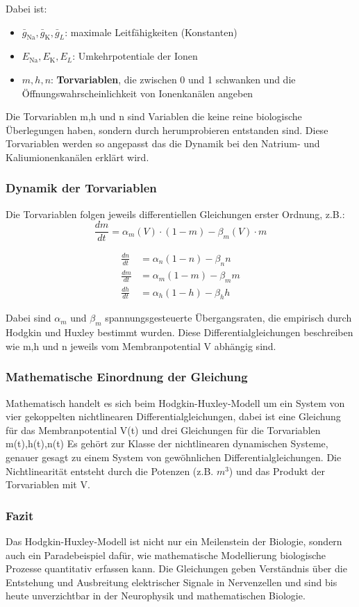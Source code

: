 \begin{refsection}
Dabei ist:

\begin{itemize}
	\item $\bar{g}_{\text{Na}}, \bar{g}_{\text{K}}, \bar{g}_L$: maximale Leitfähigkeiten (Konstanten)
	\item $E_{\text{Na}}, E_{\text{K}}, E_L$: Umkehrpotentiale der Ionen
	\item $m, h, n$: \textbf{Torvariablen}, die zwischen 0 und 1 schwanken und die Öffnungswahrscheinlichkeit von Ionenkanälen angeben
\end{itemize}
Die Torvariablen m,h und n sind Variablen die keine reine biologische Überlegungen haben, sondern durch herumprobieren entstanden sind. Diese Torvariablen werden so angepasst das die Dynamik bei den Natrium- und Kaliumionenkanälen erklärt wird.
\subsubsection{Dynamik der Torvariablen}
Die Torvariablen folgen jeweils differentiellen Gleichungen erster Ordnung, z.B.:
\[\frac{dm}{dt} = \alpha_m(V) \cdot (1 - m) - \beta_m(V) \cdot m\]

\begin{align}
	\frac{dn}{dt} &= \alpha_n (1 - n) - \beta_n n \\
	\frac{dm}{dt} &= \alpha_m (1 - m) - \beta_m m \\
	\frac{dh}{dt} &= \alpha_h (1 - h) - \beta_h h 
\end{align}

Dabei sind $\alpha_m$ und $\beta_m$ spannungsgesteuerte Übergangsraten, die empirisch durch Hodgkin und Huxley bestimmt wurden.
Diese Differentialgleichungen beschreiben wie m,h und n jeweils vom Membranpotential V abhängig sind.
\subsubsection{Mathematische Einordnung der Gleichung}
Mathematisch handelt es sich beim Hodgkin-Huxley-Modell um ein System von vier gekoppelten nichtlinearen Differentialgleichungen, dabei ist eine Gleichung für das Membranpotential V(t) und drei Gleichungen für die Torvariablen m(t),h(t),n(t)
Es gehört zur Klasse der nichtlinearen dynamischen Systeme, genauer gesagt zu einem System von gewöhnlichen Differentialgleichungen. Die Nichtlinearität entsteht durch die Potenzen (z.B. $m^3$) und das Produkt der Torvariablen mit V.
\subsubsection{Fazit}
Das Hodgkin-Huxley-Modell ist nicht nur ein Meilenstein der Biologie, sondern auch ein Paradebeispiel dafür, wie mathematische Modellierung biologische Prozesse quantitativ erfassen kann. Die Gleichungen geben Verständnis über die Entstehung und Ausbreitung elektrischer Signale in Nervenzellen und sind bis heute unverzichtbar in der Neurophysik und mathematischen Biologie.

\end{refsection}
